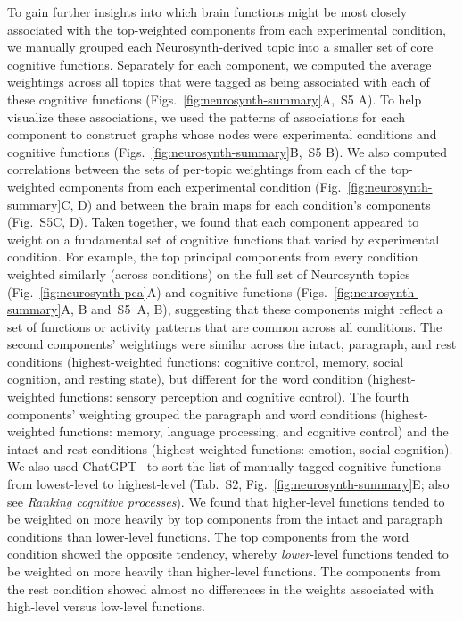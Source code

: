 \documentclass[english, 11pt]{article}
\newcommand{\neurosynthFull}{S5}
\newcommand{\topicTags}{S2}
\begin{document}
To gain further insights into which brain functions might be most closely
associated with the top-weighted components from each experimental condition,
we manually grouped each Neurosynth-derived topic into a smaller set of core
cognitive functions. Separately for each component, we computed the average
weightings across all topics that were tagged as being associated with each of
these cognitive functions (Figs.~\ref{fig:neurosynth-summary}A,~\neurosynthFull
A). To help visualize these associations, we used the patterns of associations
for each component to construct graphs whose nodes were experimental conditions
and cognitive functions (Figs.~\ref{fig:neurosynth-summary}B,~\neurosynthFull
B). We also computed correlations between the sets of per-topic weightings from
each of the top-weighted components from each experimental condition
(Fig.~\ref{fig:neurosynth-summary}C, D) and between the brain maps for each
condition's components (Fig.~\neurosynthFull C, D). Taken together, we found
that each component appeared to weight on a fundamental set of cognitive
functions that varied by experimental condition. For example, the top principal
components from every condition weighted similarly (across conditions) on the
full set of Neurosynth topics (Fig.~\ref{fig:neurosynth-pca}A) and cognitive
functions (Figs.~\ref{fig:neurosynth-summary}A, B and~\neurosynthFull~A, B),
suggesting that these components might reflect a set of functions or activity
patterns that are common across all conditions. The second components'
weightings were similar across the intact, paragraph, and rest conditions
(highest-weighted functions: cognitive control, memory, social cognition, and
resting state), but different for the word condition (highest-weighted
functions: sensory perception and cognitive control). The fourth components'
weighting grouped the paragraph and word conditions (highest-weighted
functions: memory, language processing, and cognitive control) and the intact
and rest conditions (highest-weighted functions: emotion, social cognition). We
also used ChatGPT~\citep{ChatGPT} to sort the list of manually tagged cognitive
functions from lowest-level to highest-level (Tab.~\topicTags,
Fig.~\ref{fig:neurosynth-summary}E; also see \textit{Ranking cognitive
processes}). We found that higher-level functions tended to be weighted on more
heavily by top components from the intact and paragraph conditions than
lower-level functions. The top components from the word condition showed the
opposite tendency, whereby \textit{lower}-level functions tended to be weighted
on more heavily than higher-level functions. The components from the rest
condition showed almost no differences in the weights associated with
high-level versus low-level functions.
\end{document}
